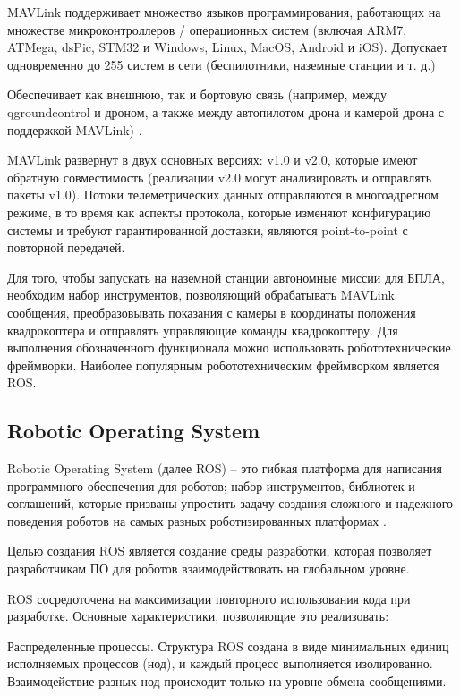 MAVLink поддерживает множество языков программирования, работающих на множестве микроконтроллеров / операционных систем (включая ARM7, ATMega, dsPic, STM32 и Windows, Linux, MacOS, Android и iOS). Допускает одновременно до 255 систем в сети (беспилотники, наземные станции и т. д.)

Обеспечивает как внешнюю, так и бортовую связь (например, между q\-ground\-con\-trol и дроном, а также между автопилотом дрона и камерой дрона с поддержкой MAVLink) \cite{mavlink}.

MAVLink развернут в двух основных версиях: v1.0 и v2.0, которые имеют обратную совместимость (реализации v2.0 могут анализировать и отправлять пакеты v1.0). Потоки телеметрических данных отправляются в многоадресном режиме, в то время как аспекты протокола, которые изменяют конфигурацию системы и требуют гарантированной доставки, являются point-to-point с повторной передачей.


Для того, чтобы запускать на наземной станции автономные миссии для БПЛА, необходим набор инструментов, позволяющий обрабатывать MAVLink сообщения, преобразовывать показания с камеры в координаты положения квадрокоптера и отправлять управляющие команды квадрокоптеру. Для выполнения обозначенного функционала можно использовать робототехнические фреймворки. Наиболее популярным робототехническим фреймворком является ROS.
\subsection{Robotic Operating System}

Robotic Operating System (далее ROS) -- это гибкая платформа для написания программного обеспечения для роботов; набор инструментов, библиотек и соглашений, которые призваны упростить задачу создания сложного и надежного поведения роботов на самых разных роботизированных платформах \cite{ros}.

Целью создания ROS является создание среды разработки, которая позволяет разработчикам ПО для роботов взаимодействовать на глобальном уровне.

ROS сосредоточена на максимизации повторного использования кода при разработке. Основные характеристики, позволяющие это реализовать:

Распределенные процессы. Структура ROS создана в виде минимальных единиц исполняемых процессов (нод), и каждый процесс выполняется изолированно. Взаимодействие разных нод происходит только на уровне обмена сообщениями.

